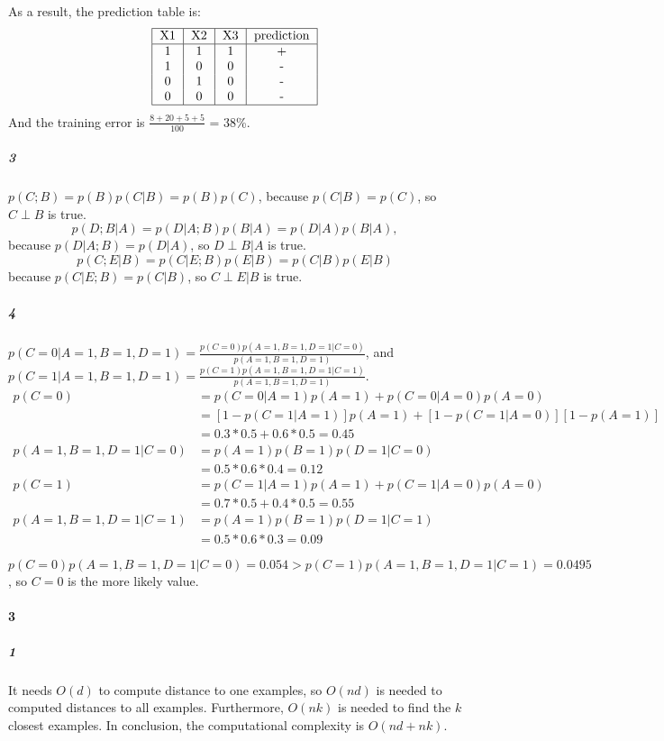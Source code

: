 \documentclass[22pt]{article}
\begin{document}
		As a result, the prediction table is:
		\begin{equation}
		\begin{tabular}{|c|c|c|c|}
			\hline
			X1 & X2 & X3 & prediction\\
			\hline
			1 & 1&1 & +\\
			1&0&0& - \\
			0&1&0 & -\\
			0&0&0 &-\\
			\hline
		\end{tabular}
		\end{equation}
		And the training error is $\frac{8+20+5+5}{100}$ = 38\%.

		\subparagraph{3}
		$p(C;B) = p(B)p(C|B) = p(B)p(C)$, because $p(C|B) = p(C)$, so $C\perp B$ is true.
		\begin{equation}
			p(D;B|A) = p(D|A;B)p(B|A)=p(D|A)p(B|A),
		\end{equation}
		because $p(D|A;B) = p(D|A)$, so $D\perp B|A$ is true.
		\begin{equation}
			p(C;E|B) = p(C|E;B)p(E|B) = p(C|B)p(E|B)
		\end{equation}
		because $p(C|E;B) = p(C|B)$, so $C\perp E|B$ is true.

		\subparagraph{4} $p(C=0|A=1,B=1,D=1)= \frac{p(C=0)p(A=1,B=1,D=1|C=0)}{p(A=1,B=1,D=1)}$, and $p(C=1|A=1,B=1,D=1)= \frac{p(C=1)p(A=1,B=1,D=1|C=1)}{p(A=1,B=1,D=1)}$.
		\begin{align}
			p(C=0)& = p(C=0|A=1)p(A=1)+p(C=0|A=0)p(A=0)\\
			 & = [1-p(C=1|A=1)]p(A=1)+[1-p(C=1|A=0)][1-p(A=1)]\\
			 & = 0.3*0.5+0.6*0.5 = 0.45\\
			p(A=1,B=1,D=1|C=0) &= p(A=1)p(B=1)p(D=1|C=0)\\
			& = 0.5*0.6*0.4 = 0.12\\
			p(C=1)& = p(C=1|A=1)p(A=1)+p(C=1|A=0)p(A=0)\\
			 & = 0.7*0.5+0.4*0.5 = 0.55\\
			p(A=1,B=1,D=1|C=1) &= p(A=1)p(B=1)p(D=1|C=1)\\
			& = 0.5*0.6*0.3 = 0.09
		\end{align}

		$p(C=0)p(A=1,B=1,D=1|C=0) = 0.054 >p(C=1)p(A=1,B=1,D=1|C=1) = 0.0495$, so $C=0$ is the more likely value.

	\paragraph{3}
		\subparagraph{1}It needs $O(d)$ to compute distance to one examples, so $O(nd)$ is needed to computed distances to all examples. Furthermore, $O(nk)$ is needed to find the $k$ closest examples. In conclusion, the computational complexity is $O(nd+nk)$.
\end{document}
